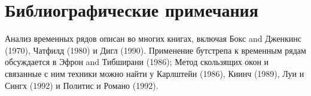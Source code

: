 \section{Библиографические примечания}

Анализ временных рядов описан во многих книгах, включая Бокс and Дженкинс (1970), Чатфилд (1980) и Дигл (1990). Применение бутстрепа к временным рядам обсуждается в Эфрон and Тибширани (1986); Метод скользящих окон и связанные с ним техники можно найти у Карлштейн (1986), Киинч (1989), Луи и Сингх (1992) и Политис и Романо (1992).